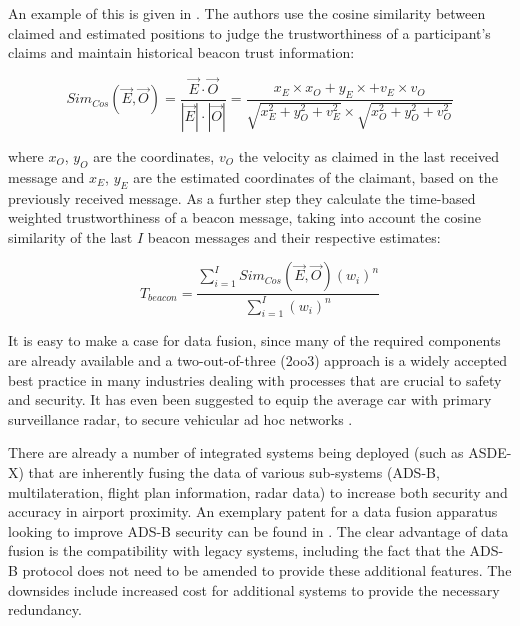 \documentclass[english]{IEEEtran}
\begin{document}
An example of this is given in \cite{Wei2003}. The authors use the
cosine similarity between claimed and estimated positions to judge
the trustworthiness of a participant's claims and maintain historical
beacon trust information:

{\scriptsize 
\begin{equation}
Sim_{Cos}(\vec{E},\vec{O})=\frac{\vec{E}\cdot\vec{O}}{|\vec{E}|\cdot|\vec{O}|}=\frac{x_{E}\times x_{O}+y_{E}\times+v_{E}\times v_{O}}{\sqrt{x_{E}^{2}+y_{O}^{2}+v_{E}^{2}}\times\sqrt{x_{O}^{2}+y_{O}^{2}+v_{O}^{2}}}
\end{equation}
}{\scriptsize \par}

where $x_{O}$, $y_{O}$ are the coordinates, $v_{O}$ the velocity
as claimed in the last received message and $x_{E}$, $y_{E}$ are
the estimated coordinates of the claimant, based on the previously
received message. As a further step they calculate the time-based
weighted trustworthiness of a beacon message, taking into account
the cosine similarity of the last $I$ beacon messages and their respective
estimates:

{\scriptsize 
\begin{equation}
T_{beacon}=\frac{\sum_{i=1}^{I}Sim_{Cos}(\vec{E},\vec{O})(w_{i})^{n}}{\sum_{i=1}^{I}(w_{i})^{n}}
\end{equation}
}{\scriptsize \par}

It is easy to make a case for data fusion, since many of the required
components are already available and a two-out-of-three (2oo3) approach
is a widely accepted best practice in many industries dealing with
processes that are crucial to safety and security. It has even been
suggested to equip the average car with primary surveillance radar,
to secure vehicular ad hoc networks \cite{Yan2008}.

There are already a number of integrated systems being deployed (such
as ASDE-X) that are inherently fusing the data of various sub-systems
(ADS-B, multilateration, flight plan information, radar data) to increase
both security and accuracy in airport proximity. An exemplary patent
for a data fusion apparatus looking to improve ADS-B security can
be found in \cite{smith2008method}. The clear advantage of data fusion
is the compatibility with legacy systems, including the fact that
the ADS-B protocol does not need to be amended to provide these additional
features. The downsides include increased cost for additional systems
to provide the necessary redundancy.\\
\end{document}
